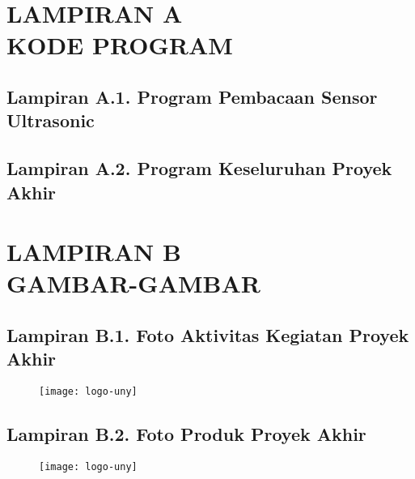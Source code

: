 
\appendix
\chapter*{LAMPIRAN A \\ KODE PROGRAM}

\section*{Lampiran A.1. Program Pembacaan Sensor Ultrasonic}


\hfill

\section*{Lampiran A.2. Program Keseluruhan Proyek Akhir}


\chapter*{LAMPIRAN B \\ GAMBAR-GAMBAR}

\section*{Lampiran B.1. Foto Aktivitas Kegiatan Proyek Akhir}
\begin{figure}[H]
    \centering
    \texttt{[image: logo-uny]}
\end{figure}

\hfill

\section*{Lampiran B.2. Foto Produk Proyek Akhir}
\begin{figure}[H]
    \centering
    \texttt{[image: logo-uny]}
\end{figure}
